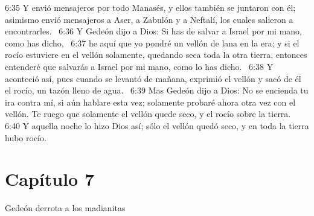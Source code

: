 6:35 Y envió mensajeros por todo Manasés, y ellos también se juntaron con él; asimismo envió mensajeros a Aser, a Zabulón y a Neftalí, los cuales salieron a encontrarles.  
6:36 Y Gedeón dijo a Dios: Si has de salvar a Israel por mi mano, como has dicho,  
6:37 he aquí que yo pondré un vellón de lana en la era; y si el rocío estuviere en el vellón solamente, quedando seca toda la otra tierra, entonces entenderé que salvarás a Israel por mi mano, como lo has dicho.  
6:38 Y aconteció así, pues cuando se levantó de mañana, exprimió el vellón y sacó de él el rocío, un tazón lleno de agua.  
6:39 Mas Gedeón dijo a Dios: No se encienda tu ira contra mí, si aún hablare esta vez; solamente probaré ahora otra vez con el vellón. Te ruego que solamente el vellón quede seco, y el rocío sobre la tierra.  
6:40 Y aquella noche lo hizo Dios así; sólo el vellón quedó seco, y en toda la tierra hubo rocío.  
\section*{Capítulo 7}
Gedeón derrota a los madianitas  

